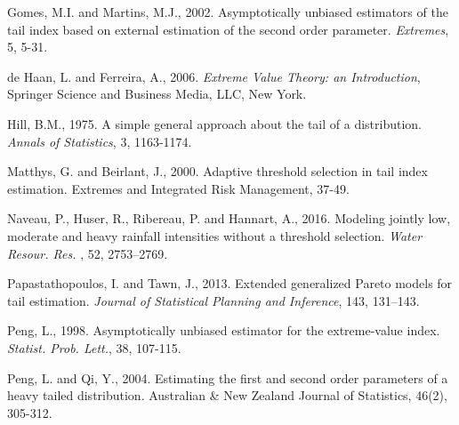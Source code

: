 \documentclass[a4paper,11pt]{article}
\begin{document}
\begin{thebibliography}{99}
  Gomes, M.I. and Martins, M.J., 2002. Asymptotically unbiased estimators of the tail index based on external estimation of the second order parameter. {\it Extremes}, 5, 5-31.
  
de Haan, L. and Ferreira, A., 2006. {\it Extreme Value Theory: an Introduction}, Springer Science and Business Media, LLC, New York.  
  
 Hill, B.M., 1975. A simple general approach about the tail of a distribution. {\it Annals of Statistics}, 3, 1163-1174.
 
 Matthys, G. and Beirlant, J., 2000. Adaptive threshold selection in tail index estimation. Extremes and Integrated Risk Management, 37-49.

Naveau, P., Huser, R., Ribereau, P. and Hannart, A., 2016. Modeling jointly low, moderate and heavy rainfall intensities without a threshold selection. {\it Water Resour. Res. }, 52,
  2753--2769.

Papastathopoulos, I. and Tawn, J., 2013. Extended generalized Pareto models for tail estimation. {\it Journal of Statistical Planning and Inference}, 143, 131--143.

Peng, L., 1998. Asymptotically unbiased estimator for the extreme-value index. {\it Statist. Prob. Lett.}, 38, 107-115.

Peng, L. and Qi, Y., 2004. Estimating the first and second order parameters of a heavy tailed distribution. Australian \& New Zealand Journal of Statistics, 46(2), 305-312.
\end{thebibliography}		
\end{document}
